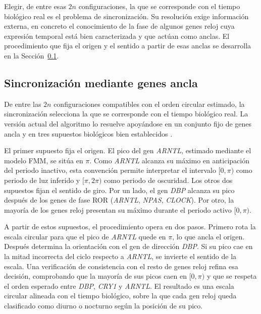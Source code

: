 \documentclass[12pt, a4paper]{report}
\begin{document}
Elegir, de entre esas $2n$ configuraciones, la que se corresponde con el tiempo biológico real es el problema de sincronización. Su resolución exige información externa, en concreto el conocimiento de la fase de algunos genes reloj cuya expresión temporal está bien caracterizada y que actúan como anclas. El procedimiento que fija el origen y el sentido a partir de esas anclas se desarrolla en la Sección~\ref{subsec:hycircust}.

\subsection{Sincronización mediante genes ancla}
\label{subsec:hycircust}

De entre las $2n$ configuraciones compatibles con el orden circular estimado, la sincronización selecciona la que se corresponde con el tiempo biológico real. La versión actual del algoritmo lo resuelve apoyándose en un conjunto fijo de genes ancla y en tres supuestos biológicos bien establecidos \cite{larriba2023}.

El primer supuesto fija el origen. El pico del gen \textit{ARNTL}, estimado mediante el modelo FMM, se sitúa en $\pi$. Como \textit{ARNTL} alcanza su máximo en anticipación del periodo inactivo, esta convención permite interpretar el intervalo $[0,\pi)$ como periodo de luz inferido y $[\pi,2\pi)$ como periodo de oscuridad. Los otros dos supuestos fijan el sentido de giro. Por un lado, el gen \textit{DBP} alcanza su pico después de los genes de fase ROR (\textit{ARNTL}, \textit{NPAS}, \textit{CLOCK}). Por otro, la mayoría de los genes reloj presentan su máximo durante el periodo activo $[0,\pi)$.

A partir de estos supuestos, el procedimiento opera en dos pasos. Primero rota la escala circular para que el pico de \textit{ARNTL} quede en $\pi$, lo que ancla el origen. Después determina la orientación con el gen de dirección \textit{DBP}. Si su pico cae en la mitad incorrecta del ciclo respecto a \textit{ARNTL}, se invierte el sentido de la escala. Una verificación de consistencia con el resto de genes reloj refina esa decisión, comprobando que la mayoría de sus picos caen en $[0,\pi)$ y que se respeta el orden esperado entre \textit{DBP}, \textit{CRY1} y \textit{ARNTL}. El resultado es una escala circular alineada con el tiempo biológico, sobre la que cada gen reloj queda clasificado como diurno o nocturno según la posición de su pico.
\end{document}
